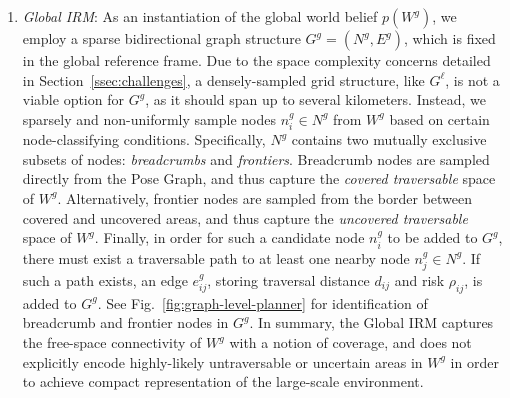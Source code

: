 \documentclass[letterpaper]{article} %
\begin{document}
\begin{enumerate}[label={\arabic*)}]
  \item \textit{Global IRM}:
As an instantiation of the global world belief $p(W^g)$, we employ a sparse bidirectional graph structure $G^g=(N^g, E^g)$, which is fixed in the global reference frame.
%   
%  
% 
%   
Due to the space complexity concerns detailed in Section~\ref{ssec:challenges}, a densely-sampled grid structure, like $G^\ell$, is not a viable option for $G^g$, as it should span up to several kilometers.
Instead, we sparsely and non-uniformly sample nodes $n^g_i \in N^g$ from $W^g$ based on certain node-classifying conditions. Specifically, $N^g$ contains two mutually exclusive subsets of nodes: \textit{breadcrumbs} 
and \textit{frontiers}. 
Breadcrumb nodes are sampled directly from the Pose Graph, and thus capture the \textit{covered traversable} space of $W^g$.
Alternatively, frontier nodes are sampled from the border between covered and uncovered areas, and thus capture the \textit{uncovered traversable} space of $W^g$. 
Finally, in order for such a candidate node $n^g_i$ to be added to $G^g$, there must exist a traversable path to at least one nearby node $n^g_j \in N^g$. If such a path exists, an edge $e^g_{ij}$, storing traversal distance $d_{ij}$ and risk $\rho_{ij}$, is added to $G^g$. 
See Fig.~\ref{fig:graph-level-planner} for identification of breadcrumb and frontier nodes in $G^g$.
In summary, the Global IRM captures the free-space connectivity of $W^g$ with a notion of coverage, and does not explicitly encode highly-likely untraversable or uncertain areas in $W^g$ in order to achieve compact representation of the large-scale environment. 


\end{enumerate}
\end{document}
